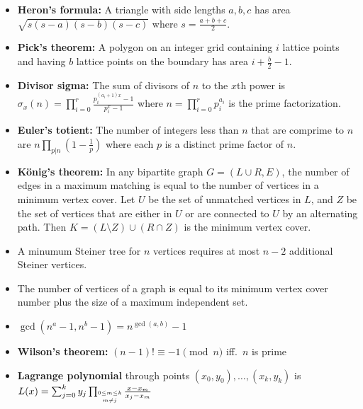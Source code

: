 \documentclass[9pt,a4paper,twocolumn,landscape,oneside]{amsart}
\newif\ifverbose
\begin{document}
\begin{itemize}[leftmargin=*]
            \item \textbf{Heron's formula:} A triangle with side lengths
                $a,b,c$ has area $\sqrt{s(s-a)(s-b)(s-c)}$ where $s =
                \frac{a+b+c}{2}$.
            \item \textbf{Pick's theorem:} A polygon on an integer grid
                containing $i$ lattice points and having $b$ lattice points on
                the boundary has area $i + \frac{b}{2} - 1$.
            \item \textbf{Divisor sigma:} The sum of divisors of $n$ to the
                $x$th power is $\sigma_x(n) = \prod_{i=0}^{r} \frac{p_i^{(a_i +
                1)x} - 1}{p_i^x - 1}$ where $n = \prod_{i=0}^r p_i^{a_i}$ is
                the prime factorization.
            \ifverbose
            \item \textbf{Divisor count:} A special case of the above is
                $\sigma_0(n) = \prod_{i=0}^r (a_i + 1)$.
            \fi
            \item \textbf{Euler's totient:} The number of integers less than
                $n$ that are comprime to $n$ are $n\prod_{p|n}\left(1 - \frac{1}{p}\right)$
                where each $p$ is a distinct prime factor of $n$.
            \item \textbf{König's theorem:} In any bipartite graph $G=(L\cup R,E)$, the number
                of edges in a maximum matching is equal to the number of
                vertices in a minimum vertex cover. Let $U$ be the set of
                unmatched vertices in $L$, and $Z$ be the set of vertices that
                are either in $U$ or are connected to $U$ by an alternating
                path. Then $K=(L\setminus Z)\cup(R\cap Z)$ is the minimum
                vertex cover.
            \item A minumum Steiner tree for $n$ vertices requires at most $n-2$ additional Steiner vertices.
            \item The number of vertices of a graph is equal to its minimum
                vertex cover number plus the size of a maximum independent set.
            \item $\gcd(n^a-1,n^b-1) = n^{\gcd(a,b)}-1$
            \item \textbf{Wilson's theorem:} $(n-1)! \equiv -1 \pmod{n}$ iff.\ $n$ is prime
            \item \textbf{Lagrange polynomial} through points $(x_0,y_0),\ldots,(x_k,y_k)$ is $L(x) = \sum_{j=0}^k y_j \prod_{\shortstack{$\scriptscriptstyle 0\leq m \leq k$ \\ $\scriptscriptstyle m\neq j$}} \frac{x-x_m}{x_j - x_m}$

\end{itemize}
\end{document}
